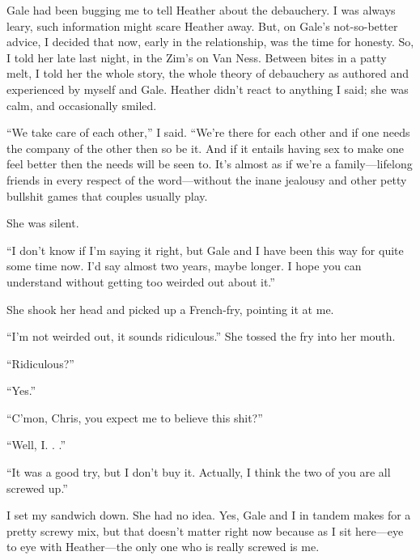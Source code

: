 Gale had been bugging me to tell Heather about the debauchery. I was
always leary, such information might scare Heather away. But, on Gale's
not-so-better advice, I decided that now, early in the relationship, was
the time for honesty. So, I told her late last night, in the Zim's on
Van Ness. Between bites in a patty melt, I told her the whole story, the
whole theory of debauchery as authored and experienced by myself and
Gale. Heather didn't react to anything I said; she was calm, and
occasionally smiled.

``We take care of each other,'' I said. ``We're there for each other and
if one needs the company of the other then so be it. And if it entails
having sex to make one feel better then the needs will be seen to. It's
almost as if we're a family---lifelong friends in every respect of the
word---without the inane jealousy and other petty bullshit games that
couples usually play.

She was silent.

``I don't know if I'm saying it right, but Gale and I have been this way
for quite some time now. I'd say almost two years, maybe longer. I hope
you can understand without getting too weirded out about it.''

She shook her head and picked up a French-fry, pointing it at me.

``I'm not weirded out, it sounds ridiculous.'' She tossed the fry into
her mouth.

``Ridiculous?''

``Yes.''

``C'mon, Chris, you expect me to believe this shit?''

``Well, I. . .''

``It was a good try, but I don't buy it. Actually, I think the two of
you are all screwed up.''

I set my sandwich down. She had no idea. Yes, Gale and I in tandem makes
for a pretty screwy mix, but that doesn't matter right now because as I
sit here---eye to eye with Heather---the only one who is really screwed
is me.

